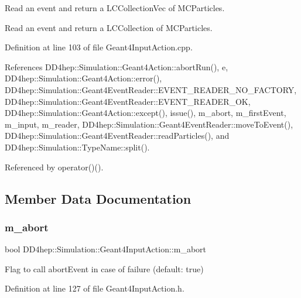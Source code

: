 Read an event and return a L\+C\+Collection\+Vec of M\+C\+Particles. 

Read an event and return a L\+C\+Collection of M\+C\+Particles. 

Definition at line 103 of file Geant4\+Input\+Action.\+cpp.



References D\+D4hep\+::\+Simulation\+::\+Geant4\+Action\+::abort\+Run(), e, D\+D4hep\+::\+Simulation\+::\+Geant4\+Action\+::error(), D\+D4hep\+::\+Simulation\+::\+Geant4\+Event\+Reader\+::\+E\+V\+E\+N\+T\+\_\+\+R\+E\+A\+D\+E\+R\+\_\+\+N\+O\+\_\+\+F\+A\+C\+T\+O\+RY, D\+D4hep\+::\+Simulation\+::\+Geant4\+Event\+Reader\+::\+E\+V\+E\+N\+T\+\_\+\+R\+E\+A\+D\+E\+R\+\_\+\+OK, D\+D4hep\+::\+Simulation\+::\+Geant4\+Action\+::except(), issue(), m\+\_\+abort, m\+\_\+first\+Event, m\+\_\+input, m\+\_\+reader, D\+D4hep\+::\+Simulation\+::\+Geant4\+Event\+Reader\+::move\+To\+Event(), D\+D4hep\+::\+Simulation\+::\+Geant4\+Event\+Reader\+::read\+Particles(), and D\+D4hep\+::\+Simulation\+::\+Type\+Name\+::split().



Referenced by operator()().



\subsection{Member Data Documentation}
\hypertarget{class_d_d4hep_1_1_simulation_1_1_geant4_input_action_a87b795b22ac455154122b4f210abf133}{}\label{class_d_d4hep_1_1_simulation_1_1_geant4_input_action_a87b795b22ac455154122b4f210abf133} 
\subsubsection{\texorpdfstring{m\+\_\+abort}{m\_abort}}
{\footnotesize\ttfamily bool D\+D4hep\+::\+Simulation\+::\+Geant4\+Input\+Action\+::m\+\_\+abort\hspace{0.3cm}{\ttfamily [protected]}}



Flag to call abort\+Event in case of failure (default\+: true) 



Definition at line 127 of file Geant4\+Input\+Action.\+h.



